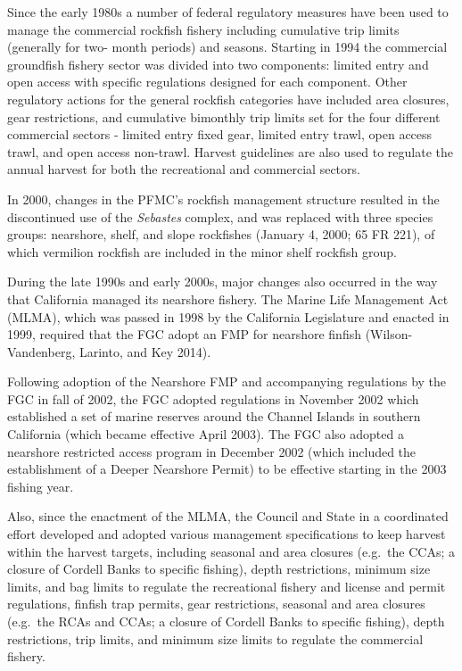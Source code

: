 \documentclass[11pt,
  english,
  a4paper,
]{article}
\begin{document}
Since the early 1980s a number of federal regulatory measures have been used to manage the commercial rockfish fishery including cumulative trip limits (generally for two- month periods) and seasons. Starting in 1994 the commercial groundfish fishery sector was divided into two components: limited entry and open access with specific regulations designed for each component. Other regulatory actions for the general rockfish categories have included area closures, gear restrictions, and cumulative bimonthly trip limits set for the four different commercial sectors - limited entry fixed gear, limited entry trawl, open access trawl, and open access non-trawl. Harvest guidelines are also used to regulate the annual harvest for both the recreational and commercial sectors.

In 2000, changes in the PFMC's rockfish management structure resulted in the discontinued use of the \emph{Sebastes} complex, and was replaced with three species groups: nearshore, shelf, and slope rockfishes (January 4, 2000; 65 FR 221), of which vermilion rockfish are included in the minor shelf rockfish group.

During the late 1990s and early 2000s, major changes also occurred in the way that California managed its nearshore fishery. The Marine Life Management Act (MLMA), which was passed in 1998 by the California Legislature and enacted in 1999, required that the FGC adopt an FMP for nearshore finfish {(Wilson-Vandenberg, Larinto, and Key 2014)\leavevmode\tagmcend\tagstructend}.

Following adoption of the Nearshore FMP and accompanying regulations by the FGC in fall of 2002, the FGC adopted regulations in November 2002 which established a set of marine reserves around the Channel Islands in southern California (which became effective April 2003). The FGC also adopted a nearshore restricted access program in December 2002 (which included the establishment of a Deeper Nearshore Permit) to be effective starting in the 2003 fishing year.

Also, since the enactment of the MLMA, the Council and State in a coordinated effort developed and adopted various management specifications to keep harvest within the harvest targets, including seasonal and area closures (e.g.~the CCAs; a closure of Cordell Banks to specific fishing), depth restrictions, minimum size limits, and bag limits to regulate the recreational fishery and license and permit regulations, finfish trap permits, gear restrictions, seasonal and area closures (e.g.~the RCAs and CCAs; a closure of Cordell Banks to specific fishing), depth restrictions, trip limits, and minimum size limits to regulate the commercial fishery.
\end{document}
